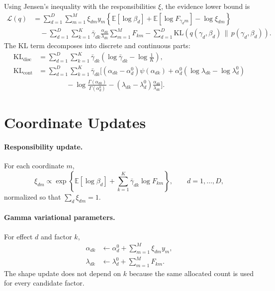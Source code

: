 \documentclass[11pt]{article}
\newcommand{\KL}{\mathrm{KL}}
\newcommand{\E}{\mathbb{E}}
\newcommand{\gb}{\bar{\gamma}}
\begin{document}
Using Jensen's inequality with the responsibilities $\xi$, the evidence lower
bound is
\begin{align}
  \mathcal{L}(q)
  &= \sum_{d=1}^D \sum_{m=1}^M
    \xi_{dm} y_m
    \left\{\E[\log \beta_d] + \E[\log F_{\gamma_d m}]
    - \log \xi_{dm}\right\} \nonumber \\
  &\quad
    - \sum_{d=1}^D \sum_{k=1}^K
    \gb_{dk}\frac{\alpha_{dk}}{\lambda_{dk}}\sum_{m=1}^M F_{km}
    - \sum_{d=1}^D \KL(q(\gamma_d,\beta_d)\,\|\,p(\gamma_d,\beta_d)).
\end{align}
The KL term decomposes into discrete and continuous parts:
\begin{align}
  \KL_{\mathrm{disc}}
  &= \sum_{d=1}^D \sum_{k=1}^K \gb_{dk}
     \left(\log \gb_{dk} - \log \frac{1}{K}\right), \\
  \KL_{\mathrm{cont}}
  &= \sum_{d=1}^D \sum_{k=1}^K \gb_{dk}
  \Bigg[
    (\alpha_{dk}-\alpha_d^0)\psi(\alpha_{dk})
    + \alpha_d^0(\log \lambda_{dk}-\log \lambda_d^0) \nonumber \\
  &\qquad\qquad
    - \log\frac{\Gamma(\alpha_{dk})}{\Gamma(\alpha_d^0)}
    - (\lambda_{dk}-\lambda_d^0)\frac{\alpha_{dk}}{\lambda_{dk}}
  \Bigg].
\end{align}

\section{Coordinate Updates}

\paragraph{Responsibility update.}
For each coordinate $m$,
\[
  \xi_{dm}
  \propto
  \exp\left\{
    \E[\log \beta_d] + \sum_{k=1}^K \gb_{dk}\log F_{km}
  \right\},
  \qquad d = 1,\ldots,D,
\]
normalized so that $\sum_d \xi_{dm}=1$.

\paragraph{Gamma variational parameters.}
For effect $d$ and factor $k$,
\begin{align}
  \alpha_{dk} &\leftarrow \alpha_d^0 + \sum_{m=1}^M \xi_{dm}y_m, \\
  \lambda_{dk} &\leftarrow \lambda_d^0 + \sum_{m=1}^M F_{km}.
\end{align}
The shape update does not depend on $k$ because the same allocated count is used
for every candidate factor.
\end{document}
